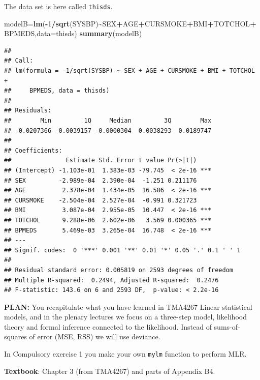 \documentclass[
  ignorenonframetext,
]{beamer}
\newenvironment{Shaded}{\begin{snugshade}}{\end{snugshade}}
\newcommand{\AttributeTok}[1]{\textcolor[rgb]{0.13,0.29,0.53}{#1}}
\newcommand{\DecValTok}[1]{\textcolor[rgb]{0.00,0.00,0.81}{#1}}
\newcommand{\FunctionTok}[1]{\textcolor[rgb]{0.13,0.29,0.53}{\textbf{#1}}}
\newcommand{\NormalTok}[1]{#1}
\newcommand{\OtherTok}[1]{\textcolor[rgb]{0.56,0.35,0.01}{#1}}
\newcommand{\SpecialCharTok}[1]{\textcolor[rgb]{0.81,0.36,0.00}{\textbf{#1}}}
\begin{document}
\begin{frame}[fragile]
The data set is here called \texttt{thisds}.

\tiny

\begin{Shaded}
\begin{Highlighting}[]
\NormalTok{modelB}\OtherTok{=}\FunctionTok{lm}\NormalTok{(}\SpecialCharTok{{-}}\DecValTok{1}\SpecialCharTok{/}\FunctionTok{sqrt}\NormalTok{(SYSBP)}\SpecialCharTok{\textasciitilde{}}\NormalTok{SEX}\SpecialCharTok{+}\NormalTok{AGE}\SpecialCharTok{+}\NormalTok{CURSMOKE}\SpecialCharTok{+}\NormalTok{BMI}\SpecialCharTok{+}\NormalTok{TOTCHOL}\SpecialCharTok{+}\NormalTok{BPMEDS,}\AttributeTok{data=}\NormalTok{thisds)}
\FunctionTok{summary}\NormalTok{(modelB)}
\end{Highlighting}
\end{Shaded}

\begin{verbatim}
## 
## Call:
## lm(formula = -1/sqrt(SYSBP) ~ SEX + AGE + CURSMOKE + BMI + TOTCHOL + 
##     BPMEDS, data = thisds)
## 
## Residuals:
##        Min         1Q     Median         3Q        Max 
## -0.0207366 -0.0039157 -0.0000304  0.0038293  0.0189747 
## 
## Coefficients:
##               Estimate Std. Error t value Pr(>|t|)    
## (Intercept) -1.103e-01  1.383e-03 -79.745  < 2e-16 ***
## SEX         -2.989e-04  2.390e-04  -1.251 0.211176    
## AGE          2.378e-04  1.434e-05  16.586  < 2e-16 ***
## CURSMOKE    -2.504e-04  2.527e-04  -0.991 0.321723    
## BMI          3.087e-04  2.955e-05  10.447  < 2e-16 ***
## TOTCHOL      9.288e-06  2.602e-06   3.569 0.000365 ***
## BPMEDS       5.469e-03  3.265e-04  16.748  < 2e-16 ***
## ---
## Signif. codes:  0 '***' 0.001 '**' 0.01 '*' 0.05 '.' 0.1 ' ' 1
## 
## Residual standard error: 0.005819 on 2593 degrees of freedom
## Multiple R-squared:  0.2494, Adjusted R-squared:  0.2476 
## F-statistic: 143.6 on 6 and 2593 DF,  p-value: < 2.2e-16
\end{verbatim}

\normalsize
\end{frame}

\begin{frame}[fragile]
\textbf{PLAN:} You recapitulate what you have learned in TMA4267 Linear
statistical models, and in the plenary lectures we focus on a three-step
model, likelihood theory and formal inference connected to the
likelihood. Instead of sums-of-squares of error (MSE, RSS) we will use
deviance.

In Compulsory exercise 1 you make your own \texttt{mylm} function to
perform MLR.

\textbf{Textbook}: Chapter 3 (from TMA4267) and parts of Appendix B4.
\end{frame}
\end{document}
